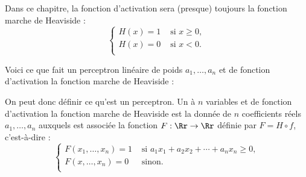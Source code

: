 \documentclass[11pt,class=report,crop=false]{standalone}
\begin{document}
Dans ce chapitre, la fonction d'activation sera (presque) toujours la fonction marche de Heaviside :
$$\begin{cases}
H(x) = 1 & \text{ si } x \ge 0, \\
H(x) = 0  & \text{ si } x < 0. \\
\end{cases}$$




Voici ce que fait un perceptron linéaire de poids $a_1,\ldots,a_n$ et de fonction d'activation la fonction marche de Heaviside :



On peut donc définir ce qu'est un perceptron. Un  à $n$ variables et de fonction d'activation la fonction marche de Heaviside est la donnée de $n$ coefficients réels $a_1,\ldots,a_n$ auxquels est associée la fonction $F : \Rr \to \Rr$ définie par $F = H \circ f$, c'est-à-dire :
$$\begin{cases}
F(x_1,\ldots,x_n) = 1 & \text{ si } a_1 x_1 + a_2 x_2 + \cdots + a_n x_n \ge 0, \\
F(x,\ldots,x_n) = 0  & \text{ sinon.} \\
\end{cases}$$
\end{document}
